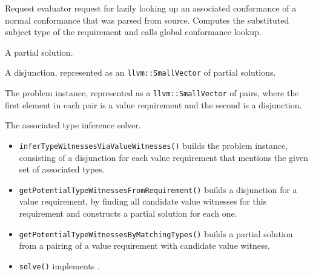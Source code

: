 \documentclass[../generics]{subfiles}
\begin{document}
Request evaluator request for lazily looking up an associated conformance of a normal conformance that was parsed from source. Computes the substituted subject type of the requirement and calls global conformance lookup.

A partial solution.

A disjunction, represented as an \verb|llvm::SmallVector| of partial solutions.

The problem instance, represented as a \verb|llvm::SmallVector| of pairs, where the first element in each pair is a value requirement and the second is a disjunction.

The associated type inference solver.
\begin{itemize}
\item \texttt{inferTypeWitnessesViaValueWitnesses()} builds the problem instance, consisting of a disjunction for each value requirement that mentions the given set of associated types.
\item \texttt{getPotentialTypeWitnessesFromRequirement()} builds a disjunction for a value requirement, by finding all candidate value witnesses for this requirement and constructs a partial solution for each one.
\item \texttt{getPotentialTypeWitnessesByMatchingTypes()} builds a partial solution from a pairing of a value requirement with candidate value witness.
\item \texttt{solve()} implements .
\end{itemize}
\end{document}
